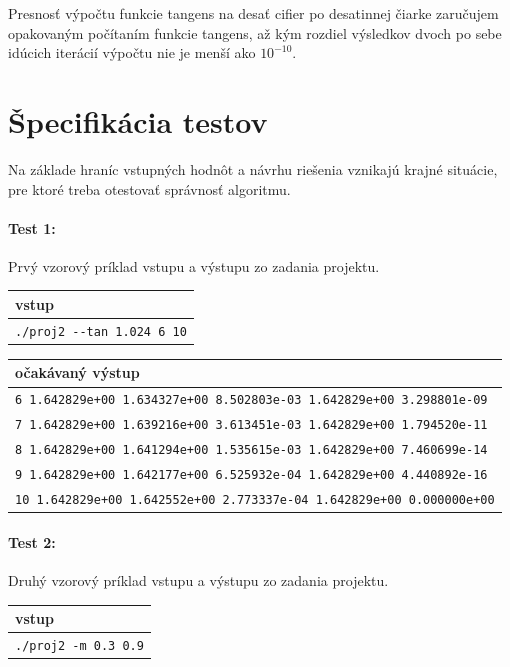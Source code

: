 \documentclass[12pt,a4paper,titlepage,final]{article}
\begin{document}
Presnosť výpočtu funkcie tangens na desať cifier po desatinnej čiarke zaručujem opakovaným počítaním funkcie tangens, až kým rozdiel výsledkov dvoch po sebe idúcich iterácií výpočtu nie je menší ako $10^{-10}$.

\section{Špecifikácia testov} \label{testy}

Na základe hraníc vstupných hodnôt a návrhu riešenia vznikajú krajné situácie, pre ktoré treba otestovať správnosť algoritmu.

\paragraph{Test 1:} Prvý vzorový príklad vstupu a výstupu zo zadania projektu.

\vspace{1em}\begin{tabular}{l}
vstup \\
\hline
\verb|./proj2 --tan 1.024 6 10|
\end{tabular}

\vspace{1em}\begin{tabular}{l}
očakávaný výstup \\
\hline
\verb|6 1.642829e+00 1.634327e+00 8.502803e-03 1.642829e+00 3.298801e-09| \\
\verb|7 1.642829e+00 1.639216e+00 3.613451e-03 1.642829e+00 1.794520e-11| \\
\verb|8 1.642829e+00 1.641294e+00 1.535615e-03 1.642829e+00 7.460699e-14| \\
\verb|9 1.642829e+00 1.642177e+00 6.525932e-04 1.642829e+00 4.440892e-16| \\
\verb|10 1.642829e+00 1.642552e+00 2.773337e-04 1.642829e+00 0.000000e+00| 
\end{tabular}

\paragraph{Test 2:} Druhý vzorový príklad vstupu a výstupu zo zadania projektu.

\vspace{1em}\begin{tabular}{l}
vstup \\
\hline
\verb|./proj2 -m 0.3 0.9|
\end{tabular}
\end{document}
